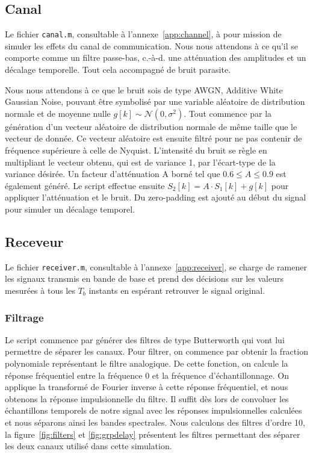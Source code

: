 \documentclass[10pt, oneside, a4paper]{article}
\begin{document}
\subsection{Canal}
Le fichier \texttt{canal.m}, consultable à l'annexe~\ref{app:channel}, à pour mission de simuler les effets du canal de communication.
Nous nous attendons à ce qu'il se comporte comme un filtre passe-bas, c.-à-d. une atténuation des amplitudes et un décalage temporelle.
Tout cela accompagné de bruit parasite.

Nous nous attendons à ce que le bruit sois de type AWGN, Additive White Gaussian Noise, pouvant être symbolisé par une variable aléatoire de distribution normale et de moyenne nulle $g[k]\sim\mathcal{N}(0,\sigma^2)$.
Tout commence par la génération d'un vecteur aléatoire de distribution normale de même taille que le vecteur de donnée.
Ce vecteur aléatoire est ensuite filtré pour ne pas contenir de fréquence supérieure à celle de Nyquist.
L'intensité du bruit se règle en multipliant le vecteur obtenu, qui est de variance 1, par l'écart-type de la variance désirée.
Un facteur d'atténuation A borné tel que $\num{0.6} \leq A \leq \num{0.9}$ est également généré.
Le script effectue ensuite $S_2[k] = A \cdot S_1[k] + g[k]$ pour appliquer l'atténuation et le bruit.
Du \og{}zero-padding\fg{} est ajouté au début du signal pour simuler un décalage temporel.

\subsection{Receveur}
Le fichier \texttt{receiver.m}, consultable à l'annexe~\ref{app:receiver}, se charge de ramener les signaux transmis en bande de base et prend des décisions sur les valeurs mesurées à tous les $T_b$ instants en espérant retrouver le signal original.

\subsubsection{Filtrage}
Le script commence par générer des filtres de type Butterworth qui vont lui permettre de séparer les canaux.
Pour filtrer, on commence par obtenir la fraction polynomiale représentant le filtre analogique.
De cette fonction, on calcule la réponse fréquentiel entre la fréquence 0 et la fréquence d'échantillonnage.
On applique la transformé de Fourier inverse à cette réponse fréquentiel, et nous obtenons la réponse impulsionnelle du filtre.
Il suffit dès lors de convoluer les échantillons temporels de notre signal avec les réponses impulsionnelles calculées et nous séparons ainsi les bandes spectrales.
Nous calculons des filtres d'ordre 10, la figure~\ref{fig:filters} et \ref{fig:grpdelay} présentent les filtres permettant des séparer les deux canaux utilisé dans cette simulation.
\end{document}
